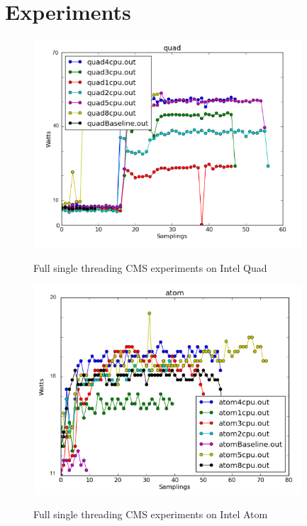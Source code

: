 \chapter{Experiments}

\begin{figure}[h!]
  \centering
    \includegraphics[width=100mm]{"img/aalto/aalto_total_quad"}
    \label{fig:nf_ss}
    \caption{Full single threading CMS experiments on Intel Quad}
\end{figure}

\begin{figure}[h!]
  \centering
    \includegraphics[width=100mm]{"img/aalto/aalto_total_atom"}
    \label{fig:nf_ss}
    \caption{Full single threading CMS experiments on Intel Atom}
\end{figure}

